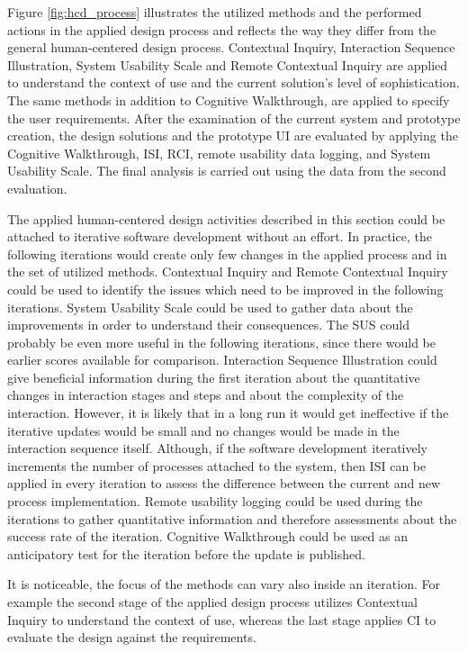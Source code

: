 \documentclass[12pt,a4paper,oneside,pdftex]{report}
\begin{document}
Figure \ref{fig:hcd_process} illustrates the utilized methods and the performed actions in the applied design process and reflects the way they differ from the general human-centered design process. Contextual Inquiry, Interaction Sequence Illustration, System Usability Scale and Remote Contextual Inquiry are applied to understand the context of use and the current solution's level of sophistication. The same methods in addition to Cognitive Walkthrough, are applied to specify the user requirements. After the examination of the current system and prototype creation, the design solutions and the prototype UI are evaluated by applying the Cognitive Walkthrough, ISI, RCI, remote usability data logging, and System Usability Scale. The final analysis is carried out using the data from the second evaluation.  

The applied human-centered design activities described in this section could be attached to iterative software development without an effort. In practice, the following iterations would create only few changes in the applied process and in the set of utilized methods. Contextual Inquiry and Remote Contextual Inquiry could be used to identify the issues which need to be improved in the following iterations. System Usability Scale could be used to gather data about the improvements in order to understand their consequences. The SUS could probably be even more useful in the following iterations, since there would be earlier scores available for comparison. Interaction Sequence Illustration could give beneficial information during the first iteration about the quantitative changes in interaction stages and steps and about the complexity of the interaction. However, it is likely that in a long run it would get ineffective if the iterative updates would be small and no changes would be made in the interaction sequence itself. Although, if the software development iteratively increments the number of processes attached to the system, then ISI can be applied in every iteration to assess the difference between the current and new process implementation. Remote usability logging could be used during the iterations to gather quantitative information and therefore assessments about the success rate of the iteration. Cognitive Walkthrough could be used as an anticipatory test for the iteration before the update is published. 

It is noticeable, the focus of the methods can vary also inside an iteration. For example the second stage of the applied design process utilizes Contextual Inquiry to understand the context of use, whereas the last stage applies CI to evaluate the design against the requirements. 
\end{document}
